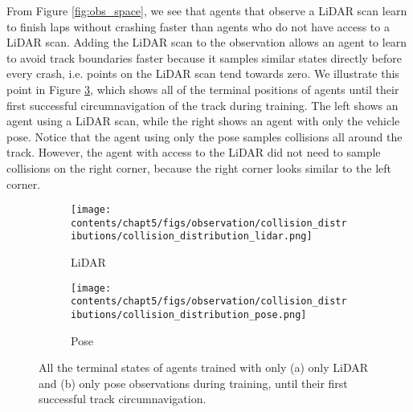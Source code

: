 From Figure \ref{fig:obs_space}, we see that agents that observe a LiDAR scan learn to finish laps without crashing faster than agents who do not have access to a LiDAR scan.
Adding the LiDAR scan to the observation allows an agent to learn to avoid track boundaries faster because it samples similar states directly before every crash, i.e. points on the LiDAR scan tend towards zero.
We illustrate this point in Figure \ref{fig:collision_distribution}, which shows all of the terminal positions of agents until their first successful circumnavigation of the track during training.
The left shows an agent using a LiDAR scan, while the right shows an agent with only the vehicle pose.
Notice that the agent using only the pose samples collisions all around the track.
However, the agent with access to the LiDAR did not need to sample collisions on the right corner, because the right corner looks similar to the left corner. 


\begin{figure}[htb!]
    \centering
    \begin{subfigure}[htb!]{0.45\textwidth}
        \centering
        \texttt{[image: contents/chapt5/figs/observation/collision\_distributions/collision\_distribution\_lidar.png]}
        \caption{LiDAR}
        \label{fig:collision_distribution_lidar}
    \end{subfigure}
    \hfill
    \begin{subfigure}[htb!]{0.45\textwidth}
        \centering
        \texttt{[image: contents/chapt5/figs/observation/collision\_distributions/collision\_distribution\_pose.png]}
        \caption{Pose}
        \label{fig:collision_distribution_pose}
    \end{subfigure}
    \hfill
\caption[Terminal poses of agents during training]{All the terminal states of agents trained with only (a) only LiDAR and (b) only pose observations during training, until their first successful track circumnavigation.}
\label{fig:collision_distribution}
\end{figure}

